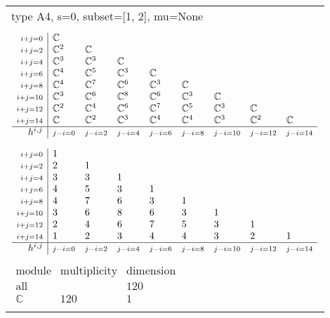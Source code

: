 \documentclass[crop,border=2mm]{standalone}
\begin{document}
\begin{tabular}{l}
{\huge type A4, s=0, subset=[1, 2], mu=None}\\ \\


$\displaystyle
\begin{array}{r|l l l l l l l l}
	{\scriptstyle i+j=0}&\mathbb{C}&&&&&&&\\
	{\scriptstyle i+j=2}&\mathbb{C}^{2}&\mathbb{C}&&&&&&\\
	{\scriptstyle i+j=4}&\mathbb{C}^{3}&\mathbb{C}^{3}&\mathbb{C}&&&&&\\
	{\scriptstyle i+j=6}&\mathbb{C}^{4}&\mathbb{C}^{5}&\mathbb{C}^{3}&\mathbb{C}&&&&\\
	{\scriptstyle i+j=8}&\mathbb{C}^{4}&\mathbb{C}^{7}&\mathbb{C}^{6}&\mathbb{C}^{3}&\mathbb{C}&&&\\
	{\scriptstyle i+j=10}&\mathbb{C}^{3}&\mathbb{C}^{6}&\mathbb{C}^{8}&\mathbb{C}^{6}&\mathbb{C}^{3}&\mathbb{C}&&\\
	{\scriptstyle i+j=12}&\mathbb{C}^{2}&\mathbb{C}^{4}&\mathbb{C}^{6}&\mathbb{C}^{7}&\mathbb{C}^{5}&\mathbb{C}^{3}&\mathbb{C}&\\
	{\scriptstyle i+j=14}&\mathbb{C}&\mathbb{C}^{2}&\mathbb{C}^{3}&\mathbb{C}^{4}&\mathbb{C}^{4}&\mathbb{C}^{3}&\mathbb{C}^{2}&\mathbb{C}\\
	\hline h^{i,j}&{\scriptstyle j-i=0}&{\scriptstyle j-i=2}&{\scriptstyle j-i=4}&{\scriptstyle j-i=6}&{\scriptstyle j-i=8}&{\scriptstyle j-i=10}&{\scriptstyle j-i=12}&{\scriptstyle j-i=14}
\end{array}
$ \\ \\


$\displaystyle
\begin{array}{r|l l l l l l l l}
	{\scriptstyle i+j=0}&1&&&&&&&\\
	{\scriptstyle i+j=2}&2&1&&&&&&\\
	{\scriptstyle i+j=4}&3&3&1&&&&&\\
	{\scriptstyle i+j=6}&4&5&3&1&&&&\\
	{\scriptstyle i+j=8}&4&7&6&3&1&&&\\
	{\scriptstyle i+j=10}&3&6&8&6&3&1&&\\
	{\scriptstyle i+j=12}&2&4&6&7&5&3&1&\\
	{\scriptstyle i+j=14}&1&2&3&4&4&3&2&1\\
	\hline h^{i,j}&{\scriptstyle j-i=0}&{\scriptstyle j-i=2}&{\scriptstyle j-i=4}&{\scriptstyle j-i=6}&{\scriptstyle j-i=8}&{\scriptstyle j-i=10}&{\scriptstyle j-i=12}&{\scriptstyle j-i=14}
\end{array}
$ \\ \\


$\displaystyle
\begin{array}{rll}
	\text{module}&\text{multiplicity}&\text{dimension} \\ \hline \text{all}&&120 \\
	\mathbb{C}&120&1
\end{array}
$ \\ \\

\end{tabular}
\end{document}
